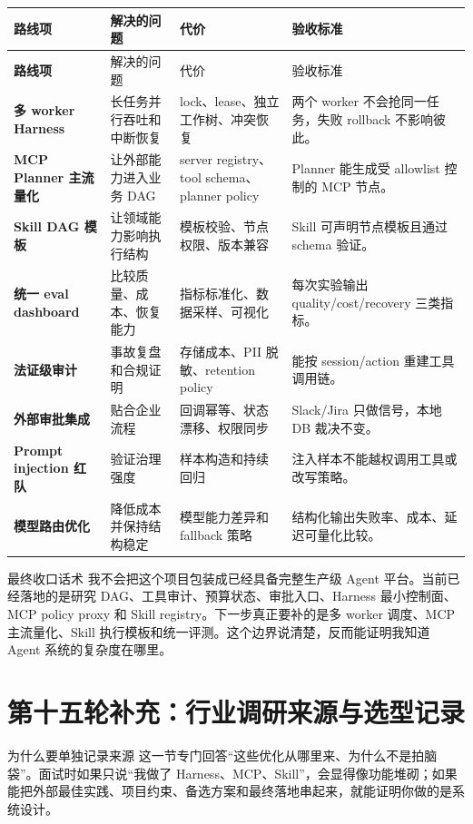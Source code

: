 \begin{longtable}{>{\bfseries}p{}p{}p{}p{}}
\toprule
路线项 & 解决的问题 & 代价 & 验收标准 \\
\midrule
\endfirsthead
\toprule
路线项 & 解决的问题 & 代价 & 验收标准 \\
\midrule
\endhead
多 worker Harness & 长任务并行吞吐和中断恢复 & lock、lease、独立工作树、冲突恢复 & 两个 worker 不会抢同一任务，失败 rollback 不影响彼此。 \\
MCP Planner 主流量化 & 让外部能力进入业务 DAG & server registry、tool schema、planner policy & Planner 能生成受 allowlist 控制的 MCP 节点。 \\
Skill DAG 模板 & 让领域能力影响执行结构 & 模板校验、节点权限、版本兼容 & Skill 可声明节点模板且通过 schema 验证。 \\
统一 eval dashboard & 比较质量、成本、恢复能力 & 指标标准化、数据采样、可视化 & 每次实验输出 quality/cost/recovery 三类指标。 \\
法证级审计 & 事故复盘和合规证明 & 存储成本、PII 脱敏、retention policy & 能按 session/action 重建工具调用链。 \\
外部审批集成 & 贴合企业流程 & 回调幂等、状态漂移、权限同步 & Slack/Jira 只做信号，本地 DB 裁决不变。 \\
Prompt injection 红队 & 验证治理强度 & 样本构造和持续回归 & 注入样本不能越权调用工具或改写策略。 \\
模型路由优化 & 降低成本并保持结构稳定 & 模型能力差异和 fallback 策略 & 结构化输出失败率、成本、延迟可量化比较。 \\
\bottomrule
\end{longtable}

\begin{qaBox}{最终收口话术}
我不会把这个项目包装成已经具备完整生产级 Agent 平台。当前已经落地的是研究 DAG、工具审计、预算状态、审批入口、Harness 最小控制面、MCP policy proxy 和 Skill registry。下一步真正要补的是多 worker 调度、MCP 主流量化、Skill 执行模板和统一评测。这个边界说清楚，反而能证明我知道 Agent 系统的复杂度在哪里。
\end{qaBox}

\section{第十五轮补充：行业调研来源与选型记录}

\begin{summaryBox}{为什么要单独记录来源}
这一节专门回答“这些优化从哪里来、为什么不是拍脑袋”。面试时如果只说“我做了 Harness、MCP、Skill”，会显得像功能堆砌；如果能把外部最佳实践、项目约束、备选方案和最终落地串起来，就能证明你做的是系统设计。
\end{summaryBox}

